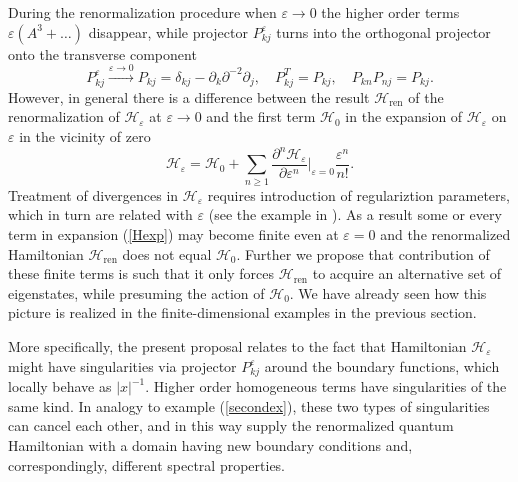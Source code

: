 \documentclass[12pt]{article}
\newcommand{\pl}{\partial}
\newcommand{\HH}{\mathscr{H}}
\newcommand{\ve}{\varepsilon}
\begin{document}
	During the renormalization procedure when
$ \ve \to 0 $
	the higher order terms
$ \ve (A^{3}+\ldots) $
	disappear, while projector
$ P_{kj}^{\ve} $
	turns into the orthogonal projector onto the transverse component
\begin{equation}
\label{Plim}
    P_{kj}^{\ve} \stackrel{\ve\to 0}{\rightarrow}
	P_{kj} = \delta_{kj} - \pl_{k} \pl^{-2} \pl_{j} ,\quad
    P_{kj}^{T} = P_{kj} ,\quad P_{kn} P_{nj} = P_{kj} .
\end{equation}
	However, in general there is a difference between the result
$ \HH_{\text{ren}} $
    of the renormalization of
$ \HH_{\ve} $ at
$ \ve\to 0 $
    and the first term
$ \HH_{0} $ in the expansion of
$ \HH_{\ve} $
    on
$ \ve $
    in the vicinity of zero
\begin{equation}
\label{Hexp}
    \HH_{\ve} = \HH_{0} + \sum_{n\geq 1}
	\frac{\partial^{n} \HH_{\ve}}{\partial\ve^{n}}\bigr|_{\ve =0}
	\frac{\ve^{n}}{n!} .
\end{equation}
    Treatment of divergences in
$ \HH_{\ve} $
    requires introduction of regulariztion parameters,
    which in turn are related with
$ \ve $ (see the example in
\cite{LFres}).
    As a result some or every term in expansion
(\ref{Hexp})
    may become finite even at
$ \ve = 0 $
    and the renormalized Hamiltonian
$ \HH_{\text{ren}} $
    does not equal
$ \HH_{0} $.
    Further we propose that contribution of these finite terms is such that
    it only forces
$ \HH_{\text{ren}} $
    to acquire an alternative set of eigenstates, while presuming the
    action of
$ \HH_{0} $.
    We have already seen how this picture is realized in the finite-dimensional
    examples in the previous section.

    More specifically, the present proposal relates to the fact that    
    Hamiltonian
$ \HH_{\ve} $
	might have singularities via projector
$ P_{kj}^{\ve} $
    around the boundary functions,
	which locally behave as
$ |x|^{-1} $.
	Higher order homogeneous terms have singularities of the same kind.
	In analogy to example
(\ref{secondex}),
	these two types of singularities can cancel each other,
	and in this way supply the renormalized quantum Hamiltonian
	with a domain having new boundary conditions and, correspondingly,
	different spectral properties.
\end{document}
